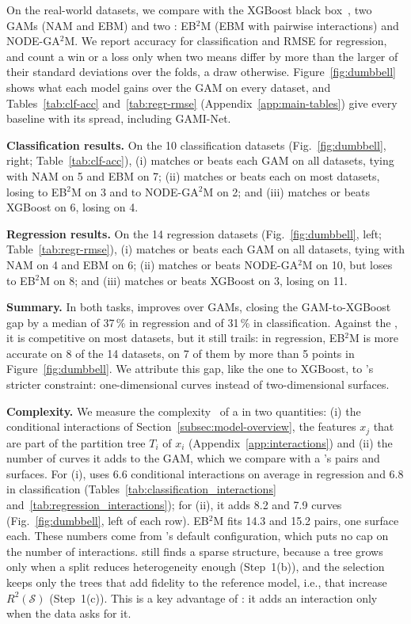 On the real-world datasets, we compare \method{} with the XGBoost black box~\cite{chen2016xgboost}, two GAMs (NAM and EBM) and two \gamms{}: EB$^2$M (EBM with pairwise interactions) and NODE-GA$^2$M.
We report accuracy for classification and RMSE for regression, and count a win or a loss only when two means differ by more than the larger of their standard deviations over the folds, a draw otherwise.
Figure~\ref{fig:dumbbell} shows what each model gains over the GAM on every dataset, and Tables~\ref{tab:clf-acc} and~\ref{tab:regr-rmse} (Appendix~\ref{app:main-tables}) give every baseline with its spread, including GAMI-Net.


\textbf{Classification results.}
On the 10 classification datasets (Fig.~\ref{fig:dumbbell}, right; Table~\ref{tab:clf-acc}), \method{}
(i) matches or beats each GAM on all datasets, tying with NAM on 5 and EBM on 7;
(ii) matches or beats each \gamm{} on most datasets, losing to EB$^2$M on 3 and to NODE-GA$^2$M on 2; and
(iii) matches or beats XGBoost on 6, losing on 4.

\textbf{Regression results.}
On the 14 regression datasets (Fig.~\ref{fig:dumbbell}, left; Table~\ref{tab:regr-rmse}), \method{}
(i) matches or beats each GAM on all datasets, tying with NAM on 4 and EBM on 6;
(ii) matches or beats NODE-GA$^2$M on 10, but loses to EB$^2$M on 8; and
(iii) matches or beats XGBoost on 3, losing on 11.

\textbf{Summary.}
In both tasks, \method{} improves over GAMs, closing the GAM-to-XGBoost gap by a median of 37\,\% in regression and of 31\,\% in classification.
Against the \gamms{}, it is competitive on most datasets, but it still trails: in regression, EB$^2$M is more accurate on 8 of the 14 datasets, on 7 of them by more than 5 points in Figure~\ref{fig:dumbbell}.
We attribute this gap, like the one to XGBoost, to \method{}'s stricter constraint: one-dimensional curves instead of two-dimensional surfaces.

\textbf{Complexity.}\label{sec:complexity}
We measure the complexity~\cite{molnar2020quantifying} of a \method{} in two quantities: (i) the conditional interactions of Section~\ref{subsec:model-overview}, the features $x_j$ that are part of the partition tree $T_i$ of $x_i$ (Appendix~\ref{app:interactions}) and (ii) the number of curves it adds to the GAM, which we compare with a \gamm{}'s pairs and surfaces.
For (i), \method{} uses 6.6 conditional interactions on average in regression and 6.8 in classification (Tables~\ref{tab:classification_interactions} and~\ref{tab:regression_interactions}); for (ii), it adds 8.2 and 7.9 curves (Fig.~\ref{fig:dumbbell}, left of each row).
EB$^2$M fits 14.3 and 15.2 pairs, one surface each.
These numbers come from \method{}'s default configuration, which puts no cap on the number of interactions.
\method{} still finds a sparse structure, because a tree grows only when a split reduces heterogeneity enough (Step~1(b)), and the selection keeps only the trees that add fidelity to the reference model, i.e., that increase $R^2(\mathcal{S})$ (Step~1(c)).
This is a key advantage of \method{}: it adds an interaction only when the data asks for it.

